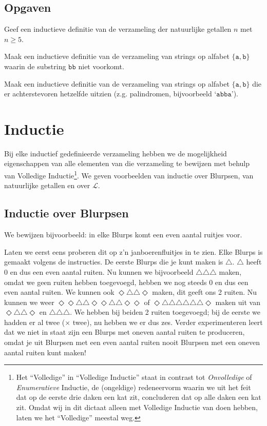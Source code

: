 \subsection{Opgaven}
\begin{exercise}
Geef een inductieve definitie van de verzameling der natuurlijke getallen $n$ met $n\geq 5$.
\end{exercise}

\begin{exercise}
Maak een inductieve definitie van de verzameling van strings op alfabet $\{\mathtt{a},\mathtt{b}\}$ waarin de substring $\mathtt{bb}$ niet voorkomt.
\end{exercise}

\begin{exercise}
Maak een inductieve definitie van de verzameling van strings op alfabet $\{\mathtt{a},\mathtt{b}\}$ die er achterstevoren hetzelfde uitzien (z.g. palindromen, bijvoorbeeld `$\mathtt{abba}$').
\end{exercise}


\section{Inductie}
Bij elke inductief gedefinieerde verzameling hebben we de mogelijkheid eigenschappen van alle elementen van die verzameling te bewijzen met behulp van Volledige Inductie\footnote{Het ``Volledige'' in ``Volledige Inductie'' staat in contrast tot \textit{Onvolledige} of \textit{Enumeratieve} Inductie, de (ongeldige) redeneervorm waarin we uit het feit dat op de eerste drie daken een kat zit, concluderen dat op alle daken een kat zit. Omdat wij in dit dictaat alleen met Volledige Inductie van doen hebben, laten we het ``Volledige'' meestal weg.}. We geven voorbeelden van inductie over Blurpsen, van natuurlijke getallen en over $\mathcal{L}$.

\subsection*{Inductie over Blurpsen}
We bewijzen bijvoorbeeld: in elke Blurps komt een even aantal ruitjes voor.

Laten we eerst eens proberen dit op z'n janboerenfluitjes in te zien. Elke Blurps is gemaakt volgens de instructies. De eerste Blurps die je kunt maken is $\triangle$. $\triangle$ heeft 0 en dus een even aantal ruiten. Nu kunnen we bijvoorbeeld $\triangle\triangle\triangle$ maken, omdat we geen ruiten hebben toegevoegd, hebben we nog steeds 0 en dus een even aantal ruiten. We kunnen ook $\Diamond\triangle\triangle\Diamond$ maken, dit geeft ons 2 ruiten. Nu kunnen we weer $\Diamond\Diamond\triangle\triangle\Diamond\Diamond\triangle\triangle\Diamond\Diamond$ of $\Diamond\triangle\triangle\triangle\triangle\triangle\triangle\Diamond$ maken uit van $\Diamond\triangle\triangle\Diamond$ en $\triangle\triangle\triangle$. We hebben bij beiden 2 ruiten toegevoegd; bij de eerste we hadden er al twee ($\times$ twee), nu hebben we er dus zes. Verder experimenteren leert dat we niet in staat zijn een Blurps met oneven aantal ruiten te produceren, omdat je uit Blurpsen met een even aantal ruiten nooit Blurpsen met een oneven aantal ruiten kunt maken!

